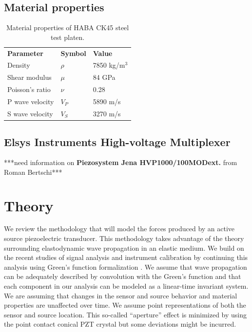 \documentclass[preprint,3p, 11pt,authoryear]{elsarticle}
\begin{document}
\subsection{Material properties}


\begin{table}[ht]
	\centering
	\caption{Material properties of HABA CK45 steel test platen.}
	\begin{tabular}{ m{5cm} m{2cm} m{4cm}} 
		\hline  
		\bf{Parameter} 			& \bf{Symbol} 		& \bf{Value}	\\
	    Density                 & $\rho$            & 7850 kg/m$^{3}$\\
	    Shear modulus           & $\mu$             & 84 GPa \\
	    Poisson's ratio         & $\nu$             & 0.28\\
	    P wave velocity         & $V_{P}$           & 5890 m/s\\
	    S wave velocity         & $V_{S}$           & 3270 m/s\\	    
		\hline  	
	\end{tabular}
	\label{table1}
\end{table}









\subsection{Elsys Instruments High-voltage Multiplexer}
***need information on \textbf{Piezosystem Jena HVP1000/100MODext.} from Roman Bertschi***



\section{Theory}
\label{theo}
We review the methodology that will model the forces produced by an active source piezoelectric transducer.  This methodology takes advantage of the theory surrounding elastodynamic wave propagation in an elastic medium.  We build on the recent studies of signal analysis and instrument calibration by \citet{McLaksey2012} continuing this analysis using Green's function formalization \citep{Aki2002, Johnson1974}. We assume that wave propagation can be adequately described by convolution with the Green's function and that each component in our analysis can be modeled as a linear-time invariant system.  We are assuming that changes in the sensor and source behavior and material properties are unaffected over time.  We assume point representations of both the sensor and source location. This so-called ``aperture'' effect is minimized by using the point contact conical PZT crystal but some deviations might be incurred.
\end{document}
